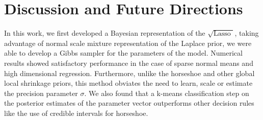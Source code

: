 \documentclass[chapters]{uamaththesis}
\def\sql{$\sqrt{\text{Lasso }}$}
\begin{document}

\chapter{Discussion and Future Directions}




In this work, we first developed a Bayesian representation of the \sql, taking advantage of normal scale mixture representation of the Laplace prior, we were able to develop a Gibbs sampler for the parameters of the model. Numerical results showed satisfactory performance in the case of sparse normal means and high dimensional regression. Furthermore, unlike the horseshoe and other global local shrinkage priors, this method obviates the need to learn, scale or estimate the precision parameter $\sigma$. We also found that a k-means classification step on the posterior estimates of the parameter vector outperforms other decision rules like the use of credible intervals for horseshoe. 
\end{document}
